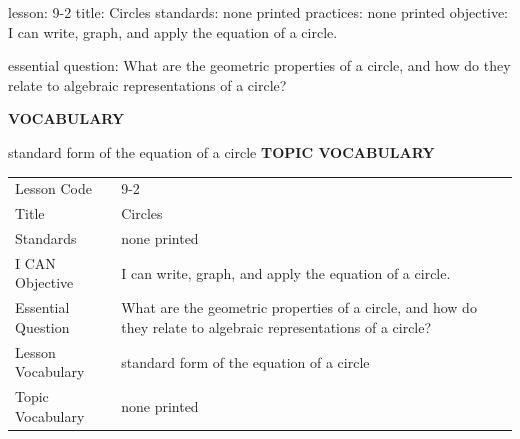 \documentclass{article}
\newenvironment{lesson-meta}{}{}        %
\newcommand{\te}[1]{}                   %
\begin{document}
\begin{lesson-meta}
lesson: 9-2
title: Circles
standards: none printed
practices: none printed
objective: I can write, graph, and apply the equation of a circle.

essential question: What are the geometric properties of a circle, and how do they relate to algebraic representations of a circle?

\textbf{VOCABULARY}
\item standard form of the equation of a circle
\textbf{TOPIC VOCABULARY}
\te{No topic vocabulary list is printed on these pages.}
\begin{tabular}{ll}
Lesson Code & 9-2 \\
Title & Circles \\
Standards & none printed \\
I CAN Objective & I can write, graph, and apply the equation of a circle. \\
Essential Question & What are the geometric properties of a circle, and how do they relate to algebraic representations of a circle? \\
Lesson Vocabulary & standard form of the equation of a circle \\
Topic Vocabulary & none printed \\
\end{tabular}
\end{lesson-meta}
\end{document}
